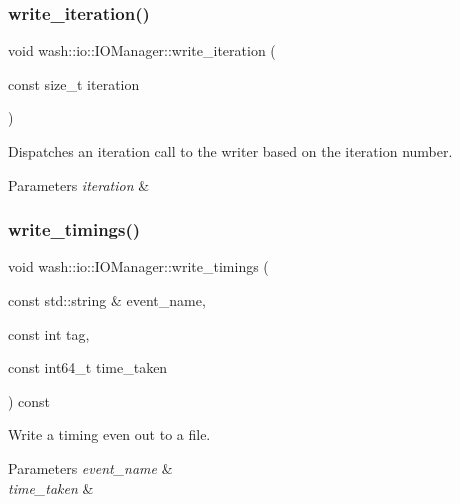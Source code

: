 \subsubsection{\texorpdfstring{write\+\_\+iteration()}{write\_iteration()}}
{\footnotesize\ttfamily void wash\+::io\+::\+I\+O\+Manager\+::write\+\_\+iteration (\begin{DoxyParamCaption}\item[{const size\+\_\+t}]{iteration }\end{DoxyParamCaption})\hspace{0.3cm}{\ttfamily [inline]}}



Dispatches an iteration call to the writer based on the iteration number. 


\begin{DoxyParams}{Parameters}
{\em iteration} & \\
\hline
\end{DoxyParams}
\mbox{\label{classwash_1_1io_1_1IOManager_ab2397361f7dc4f7b54b559d332bafb11}} 
\subsubsection{\texorpdfstring{write\+\_\+timings()}{write\_timings()}}
{\footnotesize\ttfamily void wash\+::io\+::\+I\+O\+Manager\+::write\+\_\+timings (\begin{DoxyParamCaption}\item[{const std\+::string \&}]{event\+\_\+name,  }\item[{const int}]{tag,  }\item[{const int64\+\_\+t}]{time\+\_\+taken }\end{DoxyParamCaption}) const\hspace{0.3cm}{\ttfamily [inline]}}



Write a timing even out to a file. 


\begin{DoxyParams}{Parameters}
{\em event\+\_\+name} & \\
\hline
{\em time\+\_\+taken} & \\
\hline
\end{DoxyParams}


